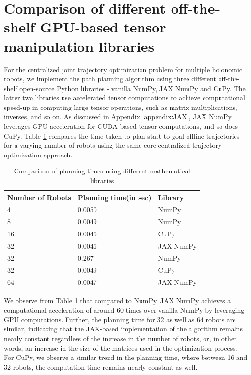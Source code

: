 \section{\label{appendix:GPU-acc-comparison}Comparison of different off-the-shelf GPU-based tensor manipulation libraries}

For the centralized joint trajectory optimization problem for multiple holonomic robots, we implement the path planning algorithm using three different off-the-shelf open-source Python libraries - vanilla NumPy, JAX NumPy and CuPy. The latter two libraries use accelerated tensor computations to achieve computational speed-up in computing large tensor operations, such as matrix multiplications, inverses, and so on. As discussed in Appendix \ref{appendix:JAX}, JAX NumPy leverages GPU acceleration for CUDA-based tensor computations, and so does CuPy. Table \ref{table: gpu-acc-comp} compares the time taken to plan start-to-goal offline trajectories for a varying number of robots using the same core centralized trajectory optimization approach.

\begin{table}
\centering
\caption{Comparison of planning times using different mathematical libraries} \label{table: gpu-acc-comp}
\scriptsize
\begin{tabular}{|p{3cm}|p{3cm}|p{3cm}|}\hline
 Number of Robots & Planning time(in sec) & Library
\\ \hline
4 & 0.0050 & NumPy
\\ \hline
8 & 0.0049 & NumPy
\\ \hline
16 & 0.0046 & CuPy
\\ \hline
32 & 0.0046 & JAX NumPy
\\ \hline
32 & 0.267 & NumPy
\\ \hline
32 & 0.0049 & CuPy
\\ \hline
64 & 0.0047 & JAX NumPy
\\ \hline
\end{tabular}
\normalsize
\vspace{-0.7cm}
\end{table}

We observe from Table \ref{table: gpu-acc-comp} that compared to NumPy, JAX NumPy achieves a computational acceleration of around $60$ times over vanilla NumPy by leveraging GPU computations. Further, the planning time for 32 as well as 64 robots are similar, indicating that the JAX-based implementation of the algorithm remains nearly constant regardless of the increase in the number of robots, or, in other words, an increase in the size of the matrices used in the optimization process. For CuPy, we observe a similar trend in the planning time, where between 16 and 32 robots, the computation time remains nearly constant as well. 

